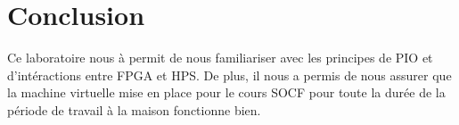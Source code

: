 \section{Conclusion}

Ce laboratoire nous à permit de nous familiariser avec les principes de PIO et d'intéractions entre FPGA et HPS. De plus, il nous a permis de nous assurer que la machine virtuelle mise en place pour le cours SOCF pour toute la durée de la période de travail à la maison fonctionne bien. 